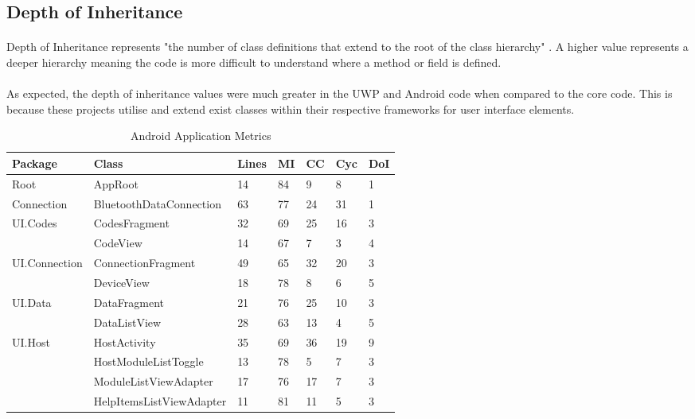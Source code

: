 {	\subsection*{Depth of Inheritance}{
		\paragraph{}{
		Depth of Inheritance represents "the number of class definitions that extend to the root of the class hierarchy" \cite{CodeMetrics}. A higher value represents a deeper hierarchy meaning the code is more difficult to understand where a method or field is defined.
		}
		\paragraph{}{
		As expected, the depth of inheritance values were much greater in the UWP and Android code when compared to the core code. This is because these projects utilise and extend exist classes within their respective frameworks for user interface elements.
		}
		
		\begin{table}[ht]
		\begin{scriptsize}			
			\begin{center}				
				\begin{tabularx}{\textwidth}{| l | X | l | l | l | l | l |}
								
				\hline
				\textbf{Package} & \textbf{Class} & \textbf{Lines} & \textbf{MI} & \textbf{CC} & \textbf{Cyc} & \textbf{DoI}\\
				\hline
				Root & AppRoot & 14 & 84 & 9 & 8 & 1\\
				\hline
				Connection & BluetoothDataConnection & 63 & 77 & 24 & 31 & 1\\
				\hline
				\multirow{2}{*}{UI.Codes} & CodesFragment & 32 & 69 & 25 & 16 & 3\\\cline{2-7}
										  & CodeView & 14 & 67 & 7 & 3 & 4\\\cline{2-7}
				\hline
				\multirow{2}{*}{UI.Connection} & ConnectionFragment & 49 & 65 & 32 & 20 & 3\\\cline{2-7}
										  	   & DeviceView & 18 & 78 & 8 & 6 & 5\\\cline{2-7}
				\hline
				\multirow{2}{*}{UI.Data} & DataFragment & 21 & 76 & 25 & 10 & 3\\\cline{2-7}
     							  	     & DataListView & 28 & 63 & 13 & 4 & 5\\\cline{2-7}
				\hline
				\multirow{4}{*}{UI.Host} & HostActivity & 35 & 69 & 36 & 19 & 9\\\cline{2-7}
										 & HostModuleListToggle & 13 & 78 & 5 & 7 & 3\\\cline{2-7}
										 & ModuleListViewAdapter & 17 & 76 & 17 & 7 & 3\\\cline{2-7}
										 & HelpItemsListViewAdapter & 11 & 81 & 11 & 5 & 3\\\cline{2-7}
				\hline
				\end{tabularx}
				\caption{Android Application Metrics}
				\label{tab:AndroidApp}
			\end{center}
		\end{scriptsize}
		\end{table}		
		
}}
